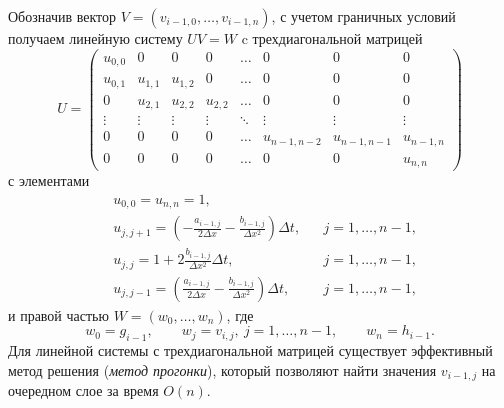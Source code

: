 Обозначив вектор $V = (v_{i-1,0},\dots,v_{i-1,n})$, с учетом граничных условий получаем линейную систему $UV = W$ c трехдиагональной матрицей
\[
U = \begin{pmatrix}
u_{0,0} & 0       & 0       & 0       & \dots  & 0      & 0       & 0\\ 
u_{0,1} & u_{1,1} & u_{1,2} & 0       & \dots  & 0      & 0       & 0\\
0       & u_{2,1} & u_{2,2} & u_{2,2} & \dots  & 0      & 0       & 0\\
\vdots  & \vdots  & \vdots  &  \vdots & \ddots & \vdots & \vdots & \vdots  \\
0       & 0       & 0       & 0       & \dots  & u_{n-1,n-2} & u_{n-1,n-1} & u_{n-1,n}\\
0       & 0       & 0       & 0       & \dots  & 0           & 0           & u_{n,n}
\end{pmatrix}
\]
с элементами
\begin{align*}
&u_{0,0} = u_{n,n} = 1,\\
&u_{j,j+1} = \left(-\frac{a_{i-1,j}}{2\Delta x} - \frac{b_{i-1,j}}{\Delta x^2}\right)\Delta t,& 
  &j=1,\dots,n-1,\\
&u_{j,j} = 1 + 2\frac{b_{i-1,j}}{\Delta x^2}\Delta t, & &j=1,\dots,n-1,\\
&u_{j,j-1} = \left(\frac{a_{i-1,j}}{2\Delta x} - \frac{b_{i-1,j}}{\Delta x^2}\right)\Delta t,& 
  &j=1,\dots,n-1,
\end{align*}
и правой частью $W=(w_0,\dots,w_n)$, где
\[
w_0 = g_{i-1},\qquad
w_j = v_{i,j}, \ j=1,\dots,n-1,\qquad
w_n = h_{i-1}.
\]
Для линейной системы с трехдиагональной матрицей существует эффективный метод решения (\emph{метод прогонки}), который позволяют найти значения $v_{i-1,j}$ на очередном слое за время $O(n)$. 

